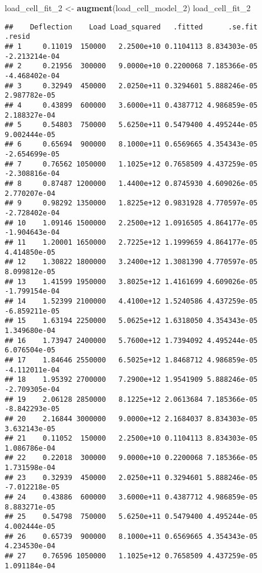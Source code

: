 \documentclass[]{book}
\newenvironment{Shaded}{\begin{snugshade}}{\end{snugshade}}
\newcommand{\DecValTok}[1]{\textcolor[rgb]{0.00,0.00,0.81}{#1}}
\newcommand{\KeywordTok}[1]{\textcolor[rgb]{0.13,0.29,0.53}{\textbf{#1}}}
\newcommand{\NormalTok}[1]{#1}
\newcommand{\StringTok}[1]{\textcolor[rgb]{0.31,0.60,0.02}{#1}}
\theoremstyle{definition}
\theoremstyle{definition}
\theoremstyle{definition}
\theoremstyle{remark}
\begin{document}
\begin{Shaded}
\begin{Highlighting}[]
\NormalTok{load_cell_fit_}\DecValTok{2}\NormalTok{ <-}\StringTok{ }\KeywordTok{augment}\NormalTok{(load_cell_model_}\DecValTok{2}\NormalTok{)}
\NormalTok{load_cell_fit_}\DecValTok{2}
\end{Highlighting}
\end{Shaded}

\begin{verbatim}
##    Deflection    Load Load_squared   .fitted      .se.fit        .resid
## 1     0.11019  150000   2.2500e+10 0.1104113 8.834303e-05 -2.213214e-04
## 2     0.21956  300000   9.0000e+10 0.2200068 7.185366e-05 -4.468402e-04
## 3     0.32949  450000   2.0250e+11 0.3294601 5.888246e-05  2.987782e-05
## 4     0.43899  600000   3.6000e+11 0.4387712 4.986859e-05  2.188327e-04
## 5     0.54803  750000   5.6250e+11 0.5479400 4.495244e-05  9.002444e-05
## 6     0.65694  900000   8.1000e+11 0.6569665 4.354343e-05 -2.654699e-05
## 7     0.76562 1050000   1.1025e+12 0.7658509 4.437259e-05 -2.308816e-04
## 8     0.87487 1200000   1.4400e+12 0.8745930 4.609026e-05  2.770207e-04
## 9     0.98292 1350000   1.8225e+12 0.9831928 4.770597e-05 -2.728402e-04
## 10    1.09146 1500000   2.2500e+12 1.0916505 4.864177e-05 -1.904643e-04
## 11    1.20001 1650000   2.7225e+12 1.1999659 4.864177e-05  4.414850e-05
## 12    1.30822 1800000   3.2400e+12 1.3081390 4.770597e-05  8.099812e-05
## 13    1.41599 1950000   3.8025e+12 1.4161699 4.609026e-05 -1.799154e-04
## 14    1.52399 2100000   4.4100e+12 1.5240586 4.437259e-05 -6.859211e-05
## 15    1.63194 2250000   5.0625e+12 1.6318050 4.354343e-05  1.349680e-04
## 16    1.73947 2400000   5.7600e+12 1.7394092 4.495244e-05  6.076504e-05
## 17    1.84646 2550000   6.5025e+12 1.8468712 4.986859e-05 -4.112011e-04
## 18    1.95392 2700000   7.2900e+12 1.9541909 5.888246e-05 -2.709305e-04
## 19    2.06128 2850000   8.1225e+12 2.0613684 7.185366e-05 -8.842293e-05
## 20    2.16844 3000000   9.0000e+12 2.1684037 8.834303e-05  3.632143e-05
## 21    0.11052  150000   2.2500e+10 0.1104113 8.834303e-05  1.086786e-04
## 22    0.22018  300000   9.0000e+10 0.2200068 7.185366e-05  1.731598e-04
## 23    0.32939  450000   2.0250e+11 0.3294601 5.888246e-05 -7.012218e-05
## 24    0.43886  600000   3.6000e+11 0.4387712 4.986859e-05  8.883271e-05
## 25    0.54798  750000   5.6250e+11 0.5479400 4.495244e-05  4.002444e-05
## 26    0.65739  900000   8.1000e+11 0.6569665 4.354343e-05  4.234530e-04
## 27    0.76596 1050000   1.1025e+12 0.7658509 4.437259e-05  1.091184e-04

\end{verbatim}
\end{document}
